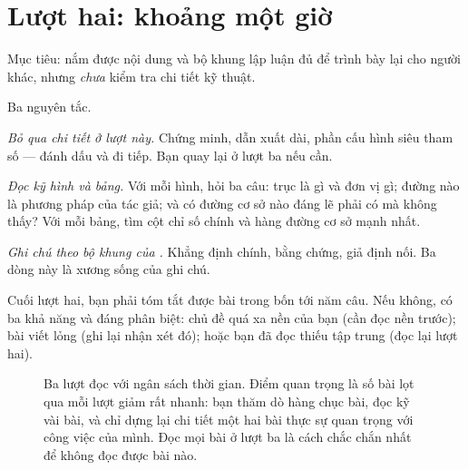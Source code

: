 \documentclass[../../english.tex]{subfiles}
\begin{document}
\section{Lượt hai: khoảng một giờ}

Mục tiêu: nắm được nội dung và bộ khung lập luận đủ để trình bày lại cho người khác, nhưng \emph{chưa} kiểm tra chi tiết kỹ thuật.

Ba nguyên tắc.

\emph{Bỏ qua chi tiết ở lượt này.} Chứng minh, dẫn xuất dài, phần cấu hình siêu tham số --- đánh dấu và đi tiếp. Bạn quay lại ở lượt ba nếu cần.

\emph{Đọc kỹ hình và bảng.} Với mỗi hình, hỏi ba câu: trục là gì và đơn vị gì; đường nào là phương pháp của tác giả; và có đường cơ sở nào đáng lẽ phải có mà không thấy? Với mỗi bảng, tìm cột chỉ số chính và hàng đường cơ sở mạnh nhất.

\emph{Ghi chú theo bộ khung của .} Khẳng định chính, bằng chứng, giả định nối. Ba dòng này là xương sống của ghi chú.

Cuối lượt hai, bạn phải tóm tắt được bài trong bốn tới năm câu. Nếu không, có ba khả năng và đáng phân biệt: chủ đề quá xa nền của bạn (cần đọc nền trước); bài viết lỏng (ghi lại nhận xét đó); hoặc bạn đã đọc thiếu tập trung (đọc lại lượt hai).

\begin{figure}[H]\centering
{}
\caption{Ba lượt đọc với ngân sách thời gian. Điểm quan trọng là số bài lọt qua mỗi lượt giảm rất nhanh: bạn thăm dò hàng chục bài, đọc kỹ vài bài, và chỉ dựng lại chi tiết một hai bài thực sự quan trọng với công việc của mình. Đọc mọi bài ở lượt ba là cách chắc chắn nhất để không đọc được bài nào.}
\label{fig:three-pass}
\end{figure}
\end{document}
